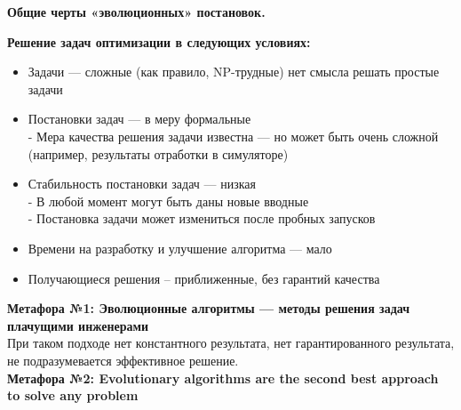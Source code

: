 \begin{center}
     \textbf{Общие черты «эволюционных» постановок.\\}
\end{center}
 \textbf{Решение задач оптимизации в следующих условиях:}
 \begin{itemize}
\item Задачи — сложные (как правило, NP-трудные) нет смысла решать простые задачи
\item Постановки задач — в меру формальные\\
- Мера качества решения задачи известна — но может быть очень сложной (например, результаты отработки в симуляторе)
\item Стабильность постановки задач — низкая\\
- В любой момент могут быть даны новые вводные\\
- Постановка задачи может измениться после пробных запусков
\item Времени на разработку и улучшение алгоритма — мало
\item Получающиеся решения – приближенные, без гарантий качества\\
\end{itemize}

\textbf{Метафора №1: Эволюционные алгоритмы — методы решения задач плачущими инженерами} \\
При таком подходе нет константного результата, нет гарантированного результата, не подразумевается эффективное решение. \\
\textbf{Метафора №2: Evolutionary algorithms are the second best approach to solve any problem\\}
